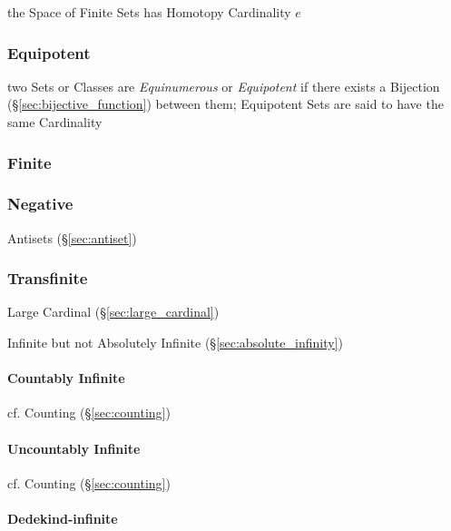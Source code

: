 the Space of Finite Sets has Homotopy Cardinality $e$



\subsubsection{Equipotent}\label{sec:equipotent}

two Sets or Classes are \emph{Equinumerous} or \emph{Equipotent} if there exists
a Bijection (\S\ref{sec:bijective_function}) between them; Equipotent Sets are
said to have the same Cardinality



\subsubsection{Finite}\label{sec:finite_cardinality}

\subsubsection{Negative}\label{sec:negative}

\fist Antisets (\S\ref{sec:antiset})



\subsubsection{Transfinite}\label{sec:transfinite}

Large Cardinal (\S\ref{sec:large_cardinal})

Infinite but not Absolutely Infinite (\S\ref{sec:absolute_infinity})



\paragraph{Countably Infinite}\label{sec:countably_infinite}\hfill

\fist cf. Counting (\S\ref{sec:counting})



\paragraph{Uncountably Infinite}\label{sec:uncountably_infinite}\hfill

\fist cf. Counting (\S\ref{sec:counting})



\paragraph{Dedekind-infinite}\label{sec:dedekind_infinite}\hfill



